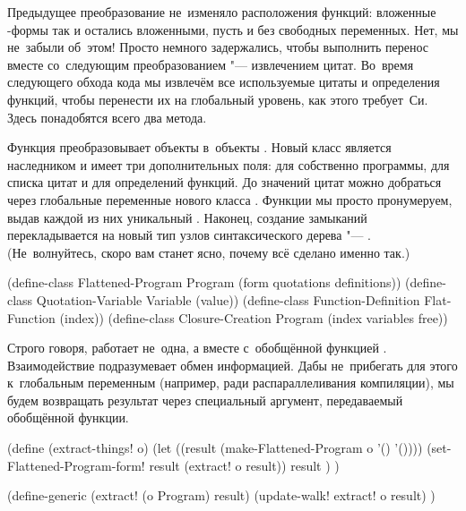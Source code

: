 Предыдущее преобразование не~изменяло расположения функций: вложенные
-формы так и остались вложенными, пусть и без свободных переменных.
Нет, мы не~забыли об~этом! Просто немного задержались, чтобы выполнить перенос
вместе со~следующим преобразованием "--- извлечением цитат. Во~время следующего
обхода кода мы извлечём все используемые цитаты и определения функций, чтобы
перенести их на глобальный уровень, как этого требует~Си. Здесь понадобятся
всего два метода.

Функция  преобразовывает объекты  в~объекты
. Новый класс является наследником  и имеет
три дополнительных поля:  для собственно программы,  для
списка цитат и  для определений функций. До значений цитат можно
добраться через глобальные переменные нового класса .
Функции мы просто пронумеруем, выдав каждой из них уникальный .
Наконец, создание замыканий перекладывается на новый тип узлов синтаксического
дерева "--- . (Не~волнуйтесь, скоро вам станет ясно, почему
всё сделано именно так.)

\begin{code:lisp}
(define-class Flattened-Program   Program (form quotations definitions))
(define-class Quotation-Variable  Variable (value))
(define-class Function-Definition Flat-Function (index))
(define-class Closure-Creation    Program (index variables free))
\end{code:lisp}

Строго говоря,  работает не~одна, а вместе с~обобщённой
функцией . Взаимодействие подразумевает обмен информацией. Дабы
не~прибегать для этого к~глобальным переменным (например, ради распараллеливания
компиляции), мы будем возвращать результат через специальный аргумент,
передаваемый обобщённой функции.

\begin{code:lisp}
(define (extract-things! o)
  (let ((result (make-Flattened-Program o '() '())))
    (set-Flattened-Program-form! result (extract! o result))
    result ) )

(define-generic (extract! (o Program) result)
  (update-walk! extract! o result) )
\end{code:lisp}

